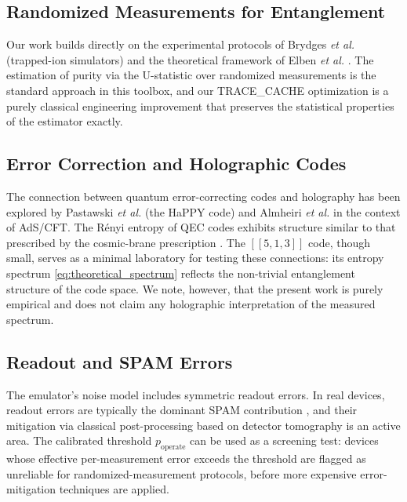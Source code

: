 \documentclass[12pt,a4paper,oneside]{book}
\theoremstyle{plain}
\theoremstyle{definition}
\theoremstyle{remark}
\begin{document}
\subsection{Randomized Measurements for Entanglement}

Our work builds directly on the experimental protocols of Brydges \textit{et al.} \cite{brydges2019probing} (trapped-ion simulators) and the theoretical framework of Elben \textit{et al.} \cite{elben2020cross, elben2023toolbox}. The estimation of purity via the U-statistic over randomized measurements is the standard approach in this toolbox, and our TRACE\_CACHE optimization is a purely classical engineering improvement that preserves the statistical properties of the estimator exactly.

\subsection{Error Correction and Holographic Codes}

The connection between quantum error-correcting codes and holography has been explored by Pastawski \textit{et al.} \cite{pastawski2015holographic} (the HaPPY code) and Almheiri \textit{et al.} \cite{almheiri2019holographic} in the context of AdS/CFT. The R\'enyi entropy of QEC codes exhibits structure similar to that prescribed by the cosmic-brane prescription \cite{dong2016holographic}. The $[[5,1,3]]$ code, though small, serves as a minimal laboratory for testing these connections: its entropy spectrum \cref{eq:theoretical_spectrum} reflects the non-trivial entanglement structure of the code space. We note, however, that the present work is purely empirical and does not claim any holographic interpretation of the measured spectrum.

\subsection{Readout and SPAM Errors}

The emulator's noise model includes symmetric readout errors. In real devices, readout errors are typically the dominant SPAM contribution \cite{maciejewski2020mitigation}, and their mitigation via classical post-processing based on detector tomography is an active area. The calibrated threshold $p_{\text{operate}}$ can be used as a screening test: devices whose effective per-measurement error exceeds the threshold are flagged as unreliable for randomized-measurement protocols, before more expensive error-mitigation techniques are applied.
\end{document}
